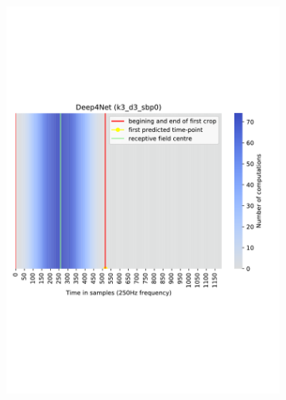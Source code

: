 \begin{figure}[!htpb]
\centering
\begin{subfigure}[b]{0.48\textwidth}
   \includegraphics[width=0.95\linewidth]{img/ch3/deep4net-receptive-field}
   \caption{}
\end{subfigure}\label{fig:receptive-field-comparison}
\begin{subfigure}[b]{0.48\textwidth}

\end{subfigure}
\end{figure}
